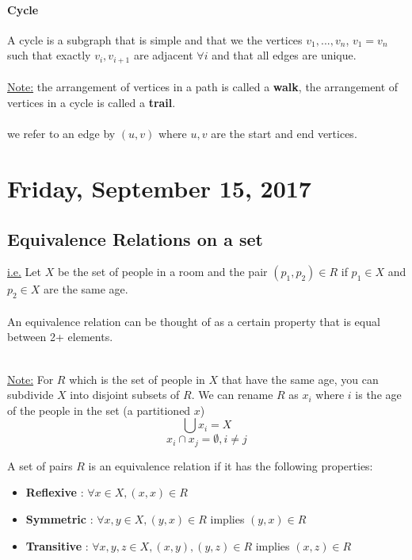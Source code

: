 \documentclass[12pt]{article}
\begin{document}
\paragraph{Cycle} A cycle is a subgraph that is simple and that we the vertices $v_1, ... ,v_{n}$, $v_1 = v_n$ such that exactly $v_i, v_{i+1}$ are adjacent $\forall i$ and that all edges are unique.\\
\\

\underline{Note:} the arrangement of vertices in a path is called a \textbf{walk}, the arrangement of vertices in a cycle is called a \textbf{trail}.\\
\\
we refer to an edge by $(u,v)$ where $u,v$ are the start and end vertices.

\newpage

\section{Friday, September 15, 2017}

\subsection{Equivalence Relations on a set}

\underline{i.e.} Let $X$ be the set of people in a room and the pair $(p_1, p_2) \in R$ if $p_1 \in X$ and $p_2 \in X$ are the same age.\\
\\
An equivalence relation can be thought of as a certain property that is equal between 2+ elements.\\
\\
\begin{tcolorbox}
	\underline{Note:} For $R$ which is the set of people in $X$ that have the same age, you can subdivide $X$ into disjoint subsets of $R$. We can rename $R$ as $x_i$ where $i$ is the age of the people in the set (a partitioned $x$)
	$$\bigcup x_i = X$$
	$$x_i \cap x_j = \emptyset, i \neq j$$
\end{tcolorbox}

\begin{tcolorbox}[title=Definition: Equivalence Relation]
	A set of pairs $R$ is an equivalence relation if it has the following properties:
	\begin{itemize}
		\item{\textbf{Reflexive} : $\forall x \in X, (x,x) \in R$}
		\item{\textbf{Symmetric} : $\forall x,y \in X, (y,x) \in R$ implies $(y,x) \in R$}
		\item{\textbf{Transitive} : $\forall x,y,z \in X, (x,y),(y,z) \in R$ implies $(x,z) \in R$}
	\end{itemize}

\end{tcolorbox}
\end{document}
